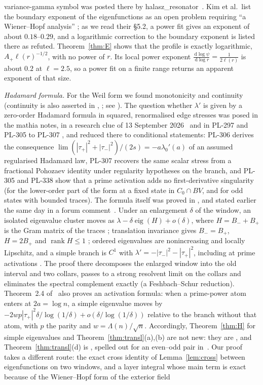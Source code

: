 \documentclass[11pt]{amsart}
\newcommand{\dd}{\,\mathrm{d}}
\theoremstyle{definition}
\theoremstyle{remark}
\numberwithin{equation}{section}
\begin{document}
variance-gamma symbol was posted there by halasz\_resonator~\cite{HR26}. Kim et al.\ list the boundary exponent of the eigenfunctions as an open problem requiring ``a Wiener--Hopf analysis'' \cite[\S\S5.2, 5.4]{Kim26}; as we read their \S5.2, a power fit gives an exponent of about $0.18$--$0.29$, and a logarithmic correction to the boundary exponent is listed there as refuted. Theorem~\ref{thm:E} shows that the profile is exactly logarithmic, $A_+\ell(r)^{-1/2}$, with no power of $r$. Its local power exponent $\frac{\dd\log\psi}{\dd\log r}=\frac1{2\ell(r)}$ is about $0.2$ at $\ell=2.5$, so a power fit on a finite range returns an apparent exponent of that size.

\emph{Hadamard formula.} For the Weil form we found monotonicity \cite[Cor.~3.7]{CCM25} and continuity \cite[Thm.~1.3]{Suz26} (continuity is also asserted in \cite[Thm.~5]{Bom00}, \cite[Thm.~4.4]{Bom03}; see \cite[\S1]{Suz26}). The question whether $\lambda'$ is given by a zero-order Hadamard formula in squared, renormalised edge stresses was posed in the mathia notes, in a research clue of 13 September 2026~\cite{mathiaClue} and in PL-297 and PL-305 to PL-307 \cite{PL297,PL305,PL306,PL307}, and reduced there to conditional statements: PL-306 derives the consequence $\lim(|\tau_+|^2+|\tau_-|^2)/(2s)=-a\lambda_0'(a)$ of an assumed regularised Hadamard law, PL-307 recovers the same scalar stress from a fractional Pohozaev identity under regularity hypotheses on the branch, and PL-305 and PL-338 show that a prime activation adds no first-derivative singularity (for the lower-order part of the form at a fixed state in $C_0\cap BV$, and for odd states with bounded traces). The formula itself was proved in \cite[Thms.~2.1--2.2]{BT26}, and stated earlier the same day in a forum comment~\cite{BT26b}. Under an enlargement $\delta$ of the window, an isolated eigenvalue cluster moves as $\lambda-\delta\operatorname{eig}(H)+o(\delta)$, where $H=B_-+B_+$ is the Gram matrix of the traces \cite[(2.3), (2.4)]{BT26}; translation invariance gives $B_-=B_+$, $H=2B_+$ and $\operatorname{rank}H\le1$ \cite[(2.5)]{BT26}; ordered eigenvalues are nonincreasing and locally Lipschitz, and a simple branch is $C^1$ with $\lambda'=-|\tau_-|^2-|\tau_+|^2$, including at prime activations \cite[Thm.~2.2, (2.6), (7.5)]{BT26}. The proof there decomposes the enlarged window into the old interval and two collars, passes to a strong resolvent limit on the collars and eliminates the spectral complement exactly (a Feshbach--Schur reduction). Theorem~2.4 of~\cite{BT26} also proves an activation formula: when a prime-power atom enters at $2a=\log n$, a simple eigenvalue moves by $-2wp|\tau_+|^2\delta/\log(1/\delta)+o(\delta/\log(1/\delta))$ relative to the branch without that atom, with $p$ the parity and $w=\Lambda(n)/\sqrt n$. Accordingly, Theorem~\ref{thm:H} for simple eigenvalues and Theorem~\ref{thm:transl}(a),(b) are not new: they are \cite[(2.5), (2.6)]{BT26}, and Theorem~\ref{thm:transl}(d) is \cite[(6.3)]{BT26}, spelled out for an even--odd pair in~\cite{SoDa}. Our proof takes a different route: the exact cross identity of Lemma~\ref{lem:cross} between eigenfunctions on two windows, and a layer integral whose main term is exact because of the Wiener--Hopf form of the exterior field 
\end{document}
